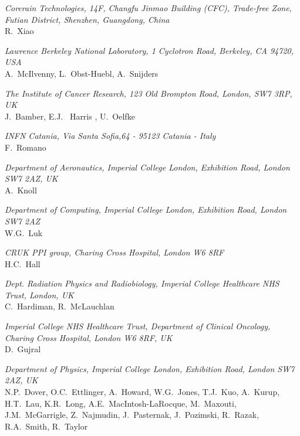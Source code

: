 \vspace{0.5cm}
\noindent \textit{Corerain Technologies, 14F, Changfu Jinmao Building (CFC), Trade-free Zone, Futian District, Shenzhen, Guangdong, China} \\
R.~Xiao
 
\vspace{0.5cm}
\noindent \textit{Lawrence Berkeley National Laboratory, 1 Cyclotron Road, Berkeley, CA 94720, USA} \\
A.~McIlvenny, L.~Obst-Huebl, A.~Snijders
 
\vspace{0.5cm}
\noindent \textit{The Institute of Cancer Research, 123 Old Brompton Road, London, SW7 3RP, UK} \\
J.~Bamber, E.J. ~Harris , U.~Oelfke
 
\vspace{0.5cm}
\noindent \textit{INFN Catania, Via Santa Sofia,64 - 95123 Catania - Italy} \\
F.~Romano
 
\vspace{0.5cm}
\noindent \textit{Department of Aeronautics, Imperial College London, Exhibition Road, London SW7 2AZ, UK} \\
A.~Knoll
 
\vspace{0.5cm}
\noindent \textit{Department of Computing, Imperial College London, Exhibition Road, London SW7 2AZ} \\
W.G.~Luk
 
\vspace{0.5cm}
\noindent \textit{CRUK PPI group, Charing Cross Hospital, London W6 8RF} \\
H.C.~Hall
 
\vspace{0.5cm}
\noindent \textit{Dept. Radiation Physics and Radiobiology, Imperial College Healthcare NHS Trust, London, UK} \\
C.~Hardiman, R.~McLauchlan
 
\vspace{0.5cm}
\noindent \textit{Imperial College NHS Healthcare Trust, Department of Clinical Oncology, Charing Cross Hospital, London W6 8RF, UK} \\
D.~Gujral
 
\vspace{0.5cm}
\noindent \textit{Department of Physics, Imperial College London, Exhibition Road, London SW7 2AZ, UK} \\
N.P.~Dover, O.C.~Ettlinger, A.~Howard, W.G.~Jones, T.J.~Kuo, A.~Kurup, H.T.~Lau, K.R.~Long, A.E.~MacIntosh-LaRocque, M.~Maxouti, J.M.~McGarrigle, Z.~Najmudin, J.~Pasternak, J.~Pozimski, R.~Razak, R.A.~Smith, R.~Taylor
 
